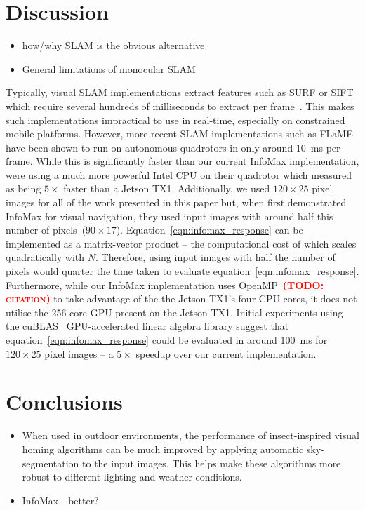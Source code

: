 \documentclass[letterpaper]{article}
\newcommand{\todo}[1]{\textbf{\textsc{\textcolor{red}{(TODO: #1)}}}}
\begin{document}
\section{Discussion}
\begin{itemize}
    \item how/why SLAM is the obvious alternative
    \item General limitations of monocular SLAM
\end{itemize}
Typically, visual SLAM implementations extract features such as SURF or SIFT which require several hundreds of milliseconds to extract per frame~\citep{Bay2006}. 
This makes such implementations impractical to use in real-time, especially on constrained mobile platforms. 
However, more recent SLAM implementations such as FLaME~\citep{Greene2017} have been shown to run on autonomous quadrotors in only around \SI{10}{\milli\second} per frame. 
While this is significantly faster than our current InfoMax implementation, \citet{Greene2017} were using a much more powerful Intel CPU on their quadrotor which \citet{Biddulph2018} measured as being $5\times$ faster than a Jetson TX1. 
Additionally, we used $120 \times 25$ pixel images for all of the work presented in this paper but, when \citet{Baddeley2012} first demonstrated InfoMax for visual navigation, they used input images with around half this number of pixels~($90\times 17$).
Equation~\ref{eqn:infomax_response} can be implemented as a matrix-vector product -- the computational cost of which scales quadratically with $N$.
Therefore, using input images with half the number of pixels would quarter the time taken to evaluate equation~\ref{eqn:infomax_response}.
Furthermore, while our InfoMax implementation uses OpenMP~\todo{citation} to take advantage of the the Jetson TX1's four CPU cores, it does not utilise the \num{256} core GPU present on the Jetson TX1.
Initial experiments using the cuBLAS~\citep{NVIDIACorporation2007} GPU-accelerated linear algebra library suggest that equation~\ref{eqn:infomax_response} could be evaluated in around \SI{100}{\milli\second} for $120 \times 25$ pixel images -- a $5 \times$ speedup over our current implementation.

\section{Conclusions}
\begin{itemize}
    \item When used in outdoor environments, the performance of insect-inspired visual homing algorithms can be much improved by applying automatic sky-segmentation to the input images. This helps make these algorithms more robust to different lighting and weather conditions.
    \item InfoMax - better?
\end{itemize}
\end{document}
